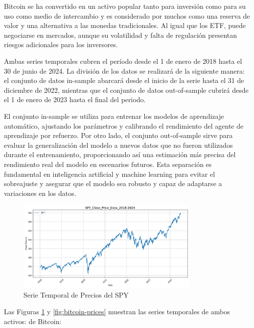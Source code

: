 \documentclass[a4paper,12pt, twoside]{report}
\begin{document}
Bitcoin se ha convertido en un activo popular tanto para inversión como para su uso 
como medio de intercambio y es considerado por muchos como una reserva de valor 
y una alternativa a las monedas tradicionales. Al igual que los ETF, puede negociarse 
en mercados, aunque su volatilidad y falta de regulación presentan riesgos 
adicionales para los inversores.



Ambas series temporales cubren el período desde el 
1 de enero de 2018 hasta el 30 de junio de 2024. La división de los datos se realizará de la 
siguiente manera: el conjunto de datos in-sample abarcará desde el inicio de la serie hasta 
el 31 de diciembre de 2022, mientras que el conjunto de datos out-of-sample cubrirá desde el 
1 de enero de 2023 hasta el final del periodo.

El conjunto in-sample se utiliza para entrenar los modelos de aprendizaje automático, 
ajustando los parámetros y calibrando el rendimiento del agente de aprendizaje por refuerzo. 
Por otro lado, el conjunto out-of-sample sirve para evaluar la generalización del modelo a 
nuevos datos que no fueron utilizados durante el entrenamiento, proporcionando así una 
estimación más precisa del rendimiento real del modelo en escenarios futuros. Esta separación 
es fundamental en inteligencia artificial y machine learning para evitar el sobreajuste y 
asegurar que el modelo sea robusto y capaz de adaptarse a variaciones en los datos.

\begin{figure}[H]
    \centering
    \includegraphics[width=0.8\textwidth]{figures/SPY_Close_Price_Data_2018-2024.png}
    \caption{Serie Temporal de Precios del SPY}
    \label{fig:spy-prices}
\end{figure}

Las Figuras \ref{fig:spy-prices} y \ref{fig:bitcoin-prices} muestran las series temporales de ambos activos: 
de Bitcoin:
\end{document}
